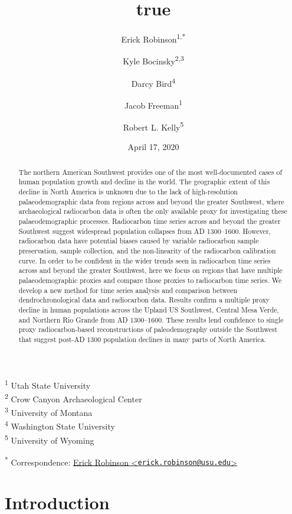 \documentclass[
]{article}
\title{true}
\author{Erick Robinson\textsuperscript{1,*} \and Kyle Bocinsky\textsuperscript{2,3} \and Darcy Bird\textsuperscript{4} \and Jacob Freeman\textsuperscript{1} \and Robert L. Kelly\textsuperscript{5}}
\date{April 17, 2020}
\begin{document}
\maketitle
\begin{abstract}
The northern American Southwest provides one of the most well-documented cases of human population growth and decline in the world. The geographic extent of this decline in North America is unknown due to the lack of high-resolution palaeodemographic data from regions across and beyond the greater Southwest, where archaeological radiocarbon data is often the only available proxy for investigating these palaeodemographic processes. Radiocarbon time series across and beyond the greater Southwest suggest widespread population collapses from AD 1300--1600. However, radiocarbon data have potential biases caused by variable radiocarbon sample preservation, sample collection, and the non-linearity of the radiocarbon calibration curve. In order to be confident in the wider trends seen in radiocarbon time series across and beyond the greater Southwest, here we focus on regions that have multiple palaeodemographic proxies and compare those proxies to radiocarbon time series. We develop a new method for time series analysis and comparison between dendrochronological data and radiocarbon data. Results confirm a multiple proxy decline in human populations across the Upland US Southwest, Central Mesa Verde, and Northern Rio Grande from AD 1300--1600. These results lend confidence to single proxy radiocarbon-based reconstructions of paleodemography outside the Southwest that suggest post-AD 1300 population declines in many parts of North America.
\end{abstract}

\textsuperscript{1} Utah State University\\
\textsuperscript{2} Crow Canyon Archaeological Center\\
\textsuperscript{3} University of Montana\\
\textsuperscript{4} Washington State University\\
\textsuperscript{5} University of Wyoming

\textsuperscript{*} Correspondence: \href{mailto:erick.robinson@usu.edu}{Erick Robinson \textless{}\href{mailto:erick.robinson@usu.edu}{\nolinkurl{erick.robinson@usu.edu}}\textgreater{}}

\newpage

\hypertarget{introduction}{%
\section*{Introduction}\label{introduction}}
\end{document}
